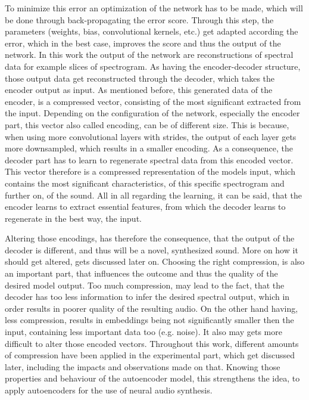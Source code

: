 To minimize this error an optimization of the network has to be made, which will be done through back-propagating the error score. Through this step, the parameters (weights, bias, convolutional kernels, etc.) get adapted according the error, which in the best case, improves the score and thus the output of the network. In this work the output of the network are reconstructions of spectral data for example slices of spectrogram. As having the encoder-decoder structure, those output data get reconstructed through the decoder, which takes the encoder output as input. As mentioned before, this generated data of the encoder, is a compressed vector, consisting of the most significant extracted from the input. Depending on the configuration of the network, especially the encoder part, this vector also called encoding, can be of different size. This is because, when using more convolutional layers with strides, the output of each layer gets more downsampled, which results in a smaller encoding. As a consequence, the decoder part has to learn to regenerate spectral data from this encoded vector. This vector therefore is a compressed representation of the models input, which contains the most significant characteristics, of this specific spectrogram and further on, of the sound. All in all regarding the learning, it can be said, that the encoder learns to extract essential features, from which the decoder learns to regenerate in the best way, the input.

Altering those encodings, has therefore the consequence, that the output of the decoder is different, and thus will be a novel, synthesized sound. More on how it should get altered, gets discussed later on.
Choosing the right compression, is also an important part, that influences the outcome and thus the quality of the desired model output. Too much compression, may lead to the fact, that the decoder has too less information to infer the desired spectral output, which in order results in poorer quality of the resulting audio. On the other hand having, less compression, results in embeddings being not significantly smaller then the input, containing less important data too (e.g. noise). It also may gets more difficult to alter those encoded vectors. Throughout this work, different amounts of compression have been applied in the experimental part, which get discussed later, including the impacts and observations made on that. Knowing those properties and behaviour of the autoencoder model, this strengthens the idea, to apply autoencoders for the use of neural audio synthesis.\\


